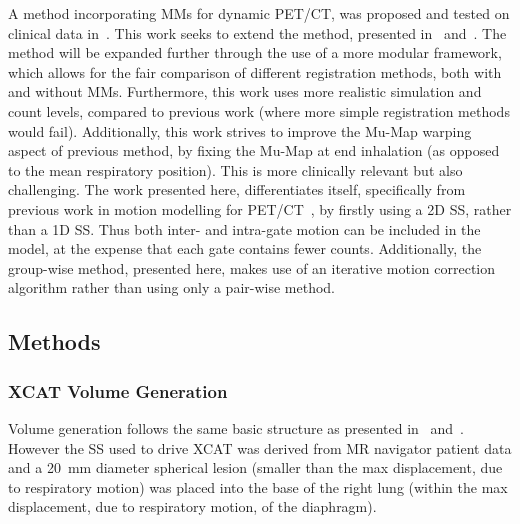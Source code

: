             A method incorporating \glspl{MM} for dynamic \gls{PET}/\gls{CT}, was proposed and tested on clinical data in~\parencite{Chan2018Non-RigidPET}. This work seeks to extend the method, presented in~ and~. The method will be expanded further through the use of a more modular framework, which allows for the fair comparison of different registration methods, both with and without \glspl{MM}. Furthermore, this work uses more realistic simulation and count levels, compared to previous work (where more simple registration methods would fail). Additionally, this work strives to improve the \gls{Mu-Map} warping aspect of previous method, by fixing the \gls{Mu-Map} at end inhalation (as opposed to the mean respiratory position). This is more clinically relevant but also challenging. The work presented here, differentiates itself, specifically from previous work in motion modelling for \gls{PET}/\gls{CT}~\parencite{Chan2018Non-RigidPET}, by firstly using a \gls{2D} \gls{SS}, rather than a \gls{1D} \gls{SS}. Thus both inter- and intra-gate motion can be included in the model, at the expense that each gate contains fewer counts. Additionally, the group-wise method, presented here, makes use of an iterative motion correction algorithm rather than using only a pair-wise method.
        
        \subsection{Methods} \label{sec:comparison_of_motion_correction_methods_incorporating_motion_modelling_for_pet_ct_using_a_single_breath_hold_attenuation_map_methods}
            
            
            \subsubsection{XCAT Volume Generation} \label{sec:comparison_of_motion_correction_methods_incorporating_motion_modelling_for_pet_ct_using_a_single_breath_hold_attenuation_map_xcat_volume_generation}
                Volume generation follows the same basic structure as presented in~ and~. However the \gls{SS} used to drive \gls{XCAT} was derived from \gls{MR} navigator patient data and a \SI{20}{\milli\metre} diameter spherical lesion (smaller than the max displacement, due to respiratory motion) was placed into the base of the right lung (within the max displacement, due to respiratory motion, of the diaphragm).
            
